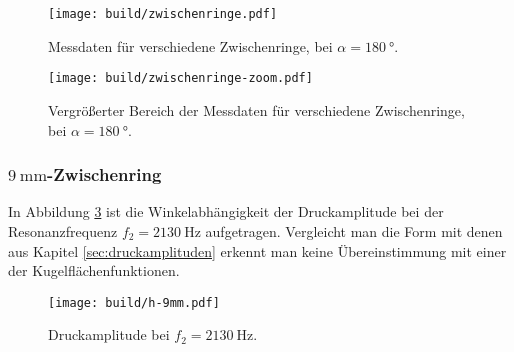 \begin{figure}
    \centering
    \texttt{[image: build/zwischenringe.pdf]}
    \caption{Messdaten für verschiedene Zwischenringe, bei $α=\SI{180}{\degree}$.}
    \label{fig:zwischenringe}
\end{figure}

\begin{figure}
    \centering
    \texttt{[image: build/zwischenringe-zoom.pdf]}
    \caption{Vergrößerter Bereich der Messdaten für verschiedene Zwischenringe, bei $α=\SI{180}{\degree}$.}
    \label{fig:zwischenringe-zoom}
\end{figure}
\FloatBarrier

\subsubsection{$\SI{9}{\milli\meter}$-Zwischenring}
In Abbildung \ref{fig:9mm} ist die Winkelabhängigkeit der Druckamplitude bei der
Resonanzfrequenz $f_2 = \SI{2130}{\hertz}$ aufgetragen.
Vergleicht man die Form mit denen aus Kapitel \ref{sec:druckamplituden} erkennt man keine Übereinstimmung mit einer der Kugelflächenfunktionen.

\begin{figure}
    \centering
    \texttt{[image: build/h-9mm.pdf]}
    \caption{Druckamplitude bei $f_2 = \SI{2130}{\hertz}$.}
    \label{fig:9mm}
\end{figure}
\FloatBarrier
